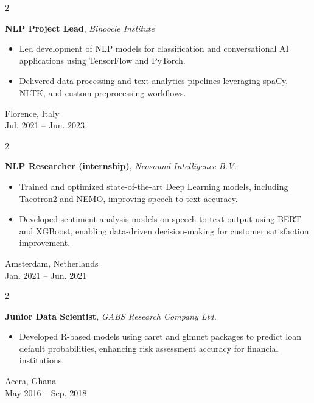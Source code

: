 \documentclass[10pt, letterpaper]{article}
\newenvironment{highlights}{
    \begin{itemize}[
        topsep=0.10 cm,
        parsep=0.10 cm,
        partopsep=0pt,
        itemsep=0pt,
        leftmargin=0.4 cm + 10pt
    ]
}{
    \end{itemize}
} %
\newenvironment{twocolentry}[2][]{
    \onecolentry
    \def\secondColumn{#2}
    \setcolumnwidth{\fill, 4.5 cm}
    \begin{paracol}{2}
}{
    \switchcolumn \raggedleft \secondColumn
    \end{paracol}
    \endonecolentry
} %
\begin{document}
    \vspace{0.2 cm}

\begin{twocolentry}{
    Florence, Italy\\
    Jul. 2021 -- Jun. 2023
}
\textbf{NLP Project Lead}, \textit{Binoocle Institute}
\begin{highlights}
    \item Led development of NLP models for classification and conversational AI applications using TensorFlow and PyTorch.
    \item Delivered data processing and text analytics pipelines leveraging spaCy, NLTK, and custom preprocessing workflows.
\end{highlights}
\end{twocolentry}

    \vspace{0.2 cm}

    \begin{twocolentry}{
        Amsterdam, Netherlands\\
    Jan. 2021 -- Jun. 2021
    }
        \textbf{NLP Researcher (internship)}, \textit{Neosound Intelligence B.V.}
        \begin{highlights}
            \item Trained and optimized state-of-the-art Deep Learning models, including Tacotron2 and NEMO, improving speech-to-text accuracy.
            \item Developed sentiment analysis models on speech-to-text output using BERT and XGBoost, enabling data-driven decision-making for customer satisfaction improvement.
        \end{highlights}
    \end{twocolentry}

    \vspace{0.2 cm}

    \begin{twocolentry}{
        Accra, Ghana\\
    May 2016 -- Sep. 2018
    }
        \textbf{Junior Data Scientist}, \textit{GABS Research Company Ltd.}
        \begin{highlights}
            \item Developed R-based models using caret and glmnet packages to predict loan default probabilities, enhancing risk assessment accuracy for financial institutions.
        \end{highlights}
    \end{twocolentry}
\end{document}
